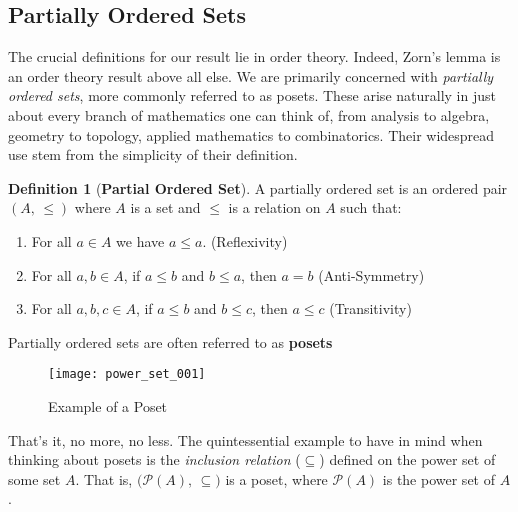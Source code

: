 \documentclass{article}
\theoremstyle{definition}
\newtheorem{definition}{Definition}[section]
\begin{document}
        \subsection{Partially Ordered Sets}
            The crucial definitions for our result lie in order theory. Indeed,
            Zorn's lemma is an order theory result above all else. We are
            primarily concerned with \textit{partially ordered sets}, more
            commonly referred to as posets. These arise naturally in just
            about every branch of mathematics one can think of, from analysis
            to algebra, geometry to topology, applied mathematics to
            combinatorics. Their widespread use stem from the simplicity
            of their definition.
            \begin{definition}[\textbf{Partial Ordered Set}]
                A partially ordered set is an ordered pair $(A,\,\leq)$
                where $A$ is a set and $\leq$ is a relation on $A$ such that:
                \begin{enumerate}
                    \item
                        For all $a\in{A}$ we have $a\leq{a}$.
                        \hfill
                        (Reflexivity)
                    \item
                        For all $a,b\in{A}$, if $a\leq{b}$ and $b\leq{a}$,
                        then $a=b$
                        \hfill
                        (Anti-Symmetry)
                    \item
                        For all $a,b,c\in{A}$, if $a\leq{b}$ and
                        $b\leq{c}$, then $a\leq{c}$
                        \hfill
                        (Transitivity)
                \end{enumerate}
                Partially ordered sets are often referred to as
                \textbf{posets}
            \end{definition}
            \begin{figure}
                \centering
                \texttt{[image: power\_set\_001]}
                \caption{Example of a Poset}
                \label{fig:power_set}
            \end{figure}
            That's it, no more, no less. The quintessential example to have
            in mind when thinking about posets is the
            \textit{inclusion relation} ($\subseteq$) defined on the power set
            of some set $A$. That is, $\big(\mathcal{P}(A),\,\subseteq\big)$
            is a poset, where $\mathcal{P}(A)$ is the power set of $A$.
\end{document}
